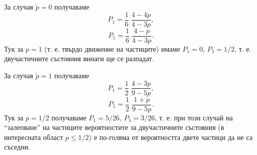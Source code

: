 \documentclass[a4paper,10pt]{article}
\begin{document}
За случая $\tilde{p}=0$ получаваме
\begin{equation}
P_1 = \frac{1}{6}\;\frac{4-4p}{4-3p},
\end{equation}
\begin{equation}
P_5 = \frac{1}{6}\;\frac{4-p}{4-3p}.
\end{equation}
Тук за $p=1$ (т. е. твърдо движение на частиците) имаме $P_1=0$, $P_5=1/2$,
т. е. двучастичните състояния винаги ще се разпадат.

За случая $\tilde{p}=1$ получаваме
\begin{equation}
 P_1 = \frac{1}{2}\;\frac{4-3p}{9-5p},
\end{equation}
\begin{equation}
P_5 = \frac{1}{2}\;\frac{1+p}{9-5p}.
\end{equation}
Тук за $p=1/2$ получаваме $P_1=5/26$, $P_5=3/26$, т. е. при този
случай на ``залепване'' на частиците вероятностите за двучастичните
състояния (в интересната област $p\le1/2$) е по-голяма от вероятността
двете частици да не са съседни.
\end{document}
